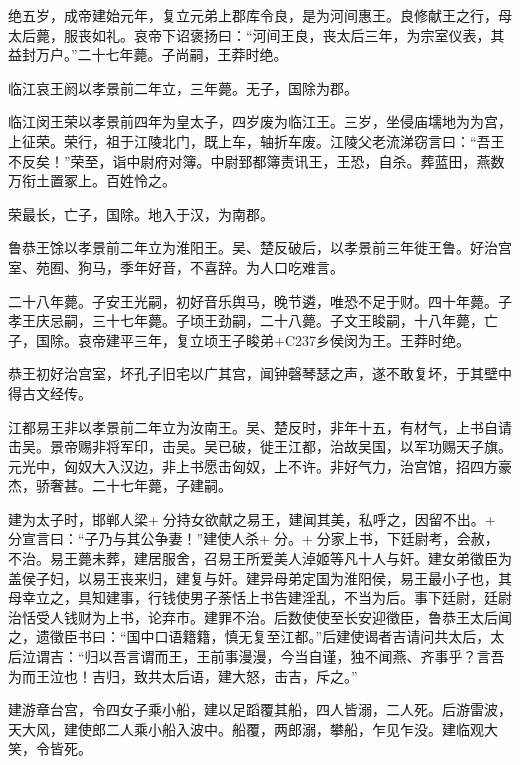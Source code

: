 \documentclass[12pt,UTF8]{ctexbook}
\begin{document}
绝五岁，成帝建始元年，复立元弟上郡库令良，是为河间惠王。良修献王之行，母太后薨，服丧如礼。哀帝下诏褒扬曰：“河间王良，丧太后三年，为宗室仪表，其益封万户。”二十七年薨。子尚嗣，王莽时绝。



临江哀王阏以孝景前二年立，三年薨。无子，国除为郡。



临江闵王荣以孝景前四年为皇太子，四岁废为临江王。三岁，坐侵庙壖地为为宫，上征荣。荣行，祖于江陵北门，既上车，轴折车废。江陵父老流涕窃言曰：“吾王不反矣！”荣至，诣中尉府对簿。中尉郅都簿责讯王，王恐，自杀。葬蓝田，燕数万衔土置冢上。百姓怜之。



荣最长，亡子，国除。地入于汉，为南郡。



鲁恭王馀以孝景前二年立为淮阳王。吴、楚反破后，以孝景前三年徙王鲁。好治宫室、苑囿、狗马，季年好音，不喜辞。为人口吃难言。



二十八年薨。子安王光嗣，初好音乐舆马，晚节遴，唯恐不足于财。四十年薨。子孝王庆忌嗣，三十七年薨。子顷王劲嗣，二十八薨。子文王睃嗣，十八年薨，亡子，国除。哀帝建平三年，复立顷王子睃弟+C237乡侯闵为王。王莽时绝。



恭王初好治宫室，坏孔子旧宅以广其宫，闻钟磬琴瑟之声，遂不敢复坏，于其壁中得古文经传。



江都易王非以孝景前二年立为汝南王。吴、楚反时，非年十五，有材气，上书自请击吴。景帝赐非将军印，击吴。吴已破，徙王江都，治故吴国，以军功赐天子旗。元光中，匈奴大入汉边，非上书愿击匈奴，上不许。非好气力，治宫馆，招四方豪杰，骄奢甚。二十七年薨，子建嗣。



建为太子时，邯郸人梁+分持女欲献之易王，建闻其美，私呼之，因留不出。+分宣言曰：“子乃与其公争妻！”建使人杀+分。+分家上书，下廷尉考，会赦，不治。易王薨未葬，建居服舍，召易王所爱美人淖姬等凡十人与奸。建女弟徵臣为盖侯子妇，以易王丧来归，建复与奸。建异母弟定国为淮阳侯，易王最小子也，其母幸立之，具知建事，行钱使男子荼恬上书告建淫乱，不当为后。事下廷尉，廷尉治恬受人钱财为上书，论弃市。建罪不治。后数使使至长安迎徵臣，鲁恭王太后闻之，遗徵臣书曰：“国中口语籍籍，慎无复至江都。”后建使谒者吉请问共太后，太后泣谓吉：“归以吾言谓而王，王前事漫漫，今当自谨，独不闻燕、齐事乎？言吾为而王泣也！吉归，致共太后语，建大怒，击吉，斥之。”



建游章台宫，令四女子乘小船，建以足蹈覆其船，四人皆溺，二人死。后游雷波，天大风，建使郎二人乘小船入波中。船覆，两郎溺，攀船，乍见乍没。建临观大笑，令皆死。
\end{document}
